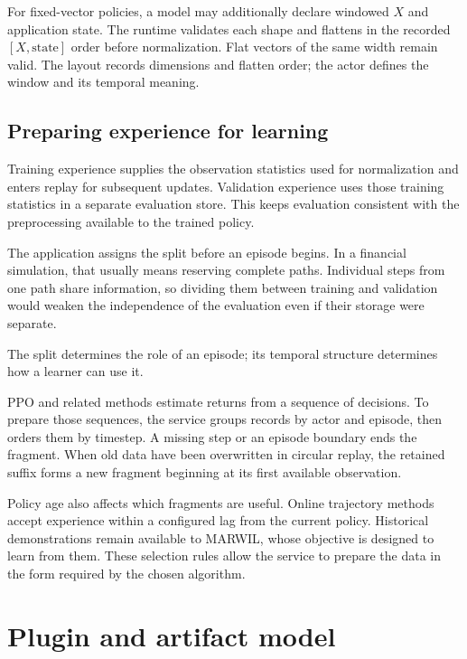 \documentclass{strategynet-journal}
\begin{document}
For fixed-vector policies, a model may additionally declare windowed $X$ and
application state.  The runtime validates each shape and flattens in
the recorded $[X,\mathrm{state}]$ order before normalization.  Flat vectors of
the same width remain valid.  The layout records dimensions and flatten order;
the actor defines the window and its temporal meaning.

\subsection{Preparing experience for learning}

Training experience supplies the observation statistics used for normalization
and enters replay for subsequent updates. Validation experience uses those
training statistics in a separate evaluation store. This keeps evaluation
consistent with the preprocessing available to the trained policy.

The application assigns the split before an episode begins. In a financial
simulation, that usually means reserving complete paths. Individual steps
from one path share information, so dividing them between training and
validation would weaken the independence of the evaluation even if their
storage were separate.

The split determines the role of an episode; its temporal structure determines
how a learner can use it.

PPO and related methods estimate returns from a sequence of decisions. To
prepare those sequences, the service groups records by actor and episode,
then orders them by timestep. A missing step or an episode boundary ends the
fragment. When old data have been overwritten in circular replay, the retained
suffix forms a new fragment beginning at its first available observation.

Policy age also affects which fragments are useful. Online trajectory methods
accept experience within a configured lag from the current policy. Historical
demonstrations remain available to MARWIL, whose objective is designed to learn
from them. These selection rules allow the service to prepare the data in the
form required by the chosen algorithm.

\section{Plugin and artifact model}
\end{document}
